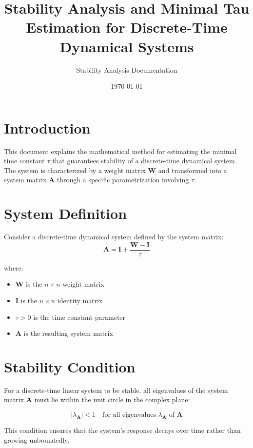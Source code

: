 \documentclass[11pt]{article}
\title{Stability Analysis and Minimal Tau Estimation for Discrete-Time Dynamical Systems}
\author{Stability Analysis Documentation}
\date{\today}
\begin{document}
\maketitle

\section{Introduction}

This document explains the mathematical method for estimating the minimal time constant $\tau$ that guarantees stability of a discrete-time dynamical system. The system is characterized by a weight matrix $\mathbf{W}$ and transformed into a system matrix $\mathbf{A}$ through a specific parametrization involving $\tau$.

\section{System Definition}

Consider a discrete-time dynamical system defined by the system matrix:
\begin{equation}
\mathbf{A} = \mathbf{I} + \frac{\mathbf{W} - \mathbf{I}}{\tau}
\end{equation}

where:
\begin{itemize}
    \item $\mathbf{W}$ is the $n \times n$ weight matrix
    \item $\mathbf{I}$ is the $n \times n$ identity matrix
    \item $\tau > 0$ is the time constant parameter
    \item $\mathbf{A}$ is the resulting system matrix
\end{itemize}

\section{Stability Condition}

For a discrete-time linear system to be stable, all eigenvalues of the system matrix $\mathbf{A}$ must lie within the unit circle in the complex plane:

\begin{equation}
|\lambda_{\mathbf{A}}| < 1 \quad \text{for all eigenvalues } \lambda_{\mathbf{A}} \text{ of } \mathbf{A}
\end{equation}

This condition ensures that the system's response decays over time rather than growing unboundedly.
\end{document}
